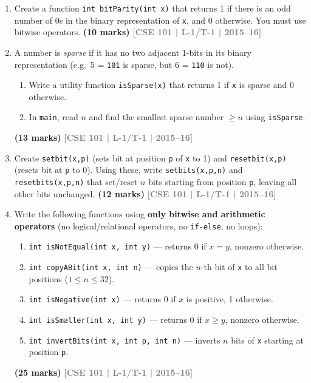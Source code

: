 \documentclass[12pt,a3paper]{article}
\newcommand{\yr}[1]{\hfill\textcolor{gray}{\small\textbf{[#1]}}}
\newcommand{\mk}[1]{\textcolor{orange!70!black}{\small\textbf{(#1 marks)}}}
\begin{document}
\begin{enumerate}
\item Create a function \texttt{int bitParity(int x)} that returns 1 if there is an odd number of 0s in the binary representation of \texttt{x}, and 0 otherwise. You must use bitwise operators.
\mk{10} \yr{CSE 101 | L-1/T-1 | 2015--16}

\item A number is \textit{sparse} if it has no two adjacent 1-bits in its binary representation (e.g.\ 5 = \texttt{101} is sparse, but 6 = \texttt{110} is not).
\begin{enumerate}
  \item Write a utility function \texttt{isSparse(x)} that returns 1 if \texttt{x} is sparse and 0 otherwise.
  \item In \texttt{main}, read $n$ and find the smallest sparse number $\ge n$ using \texttt{isSparse}.
\end{enumerate}
\mk{13} \yr{CSE 101 | L-1/T-1 | 2015--16}

\item Create \texttt{setbit(x,p)} (sets bit at position \texttt{p} of \texttt{x} to 1) and \texttt{resetbit(x,p)} (resets bit at \texttt{p} to 0). Using these, write \texttt{setbits(x,p,n)} and \texttt{resetbits(x,p,n)} that set/reset $n$ bits starting from position \texttt{p}, leaving all other bits unchanged.
\mk{12} \yr{CSE 101 | L-1/T-1 | 2015--16}

\item Write the following functions using \textbf{only bitwise and arithmetic operators} (no logical/relational operators, no \texttt{if-else}, no loops):
\begin{enumerate}
  \item \texttt{int isNotEqual(int x, int y)} --- returns 0 if $x = y$, nonzero otherwise.
  \item \texttt{int copyABit(int x, int n)} --- copies the $n$-th bit of \texttt{x} to all bit positions ($1 \le n \le 32$).
  \item \texttt{int isNegative(int x)} --- returns 0 if $x$ is positive, 1 otherwise.
  \item \texttt{int isSmaller(int x, int y)} --- returns 0 if $x \ge y$, nonzero otherwise.
  \item \texttt{int invertBits(int x, int p, int n)} --- inverts $n$ bits of \texttt{x} starting at position \texttt{p}.
\end{enumerate}
\mk{25} \yr{CSE 101 | L-1/T-1 | 2015--16}


\end{enumerate}
\end{document}

